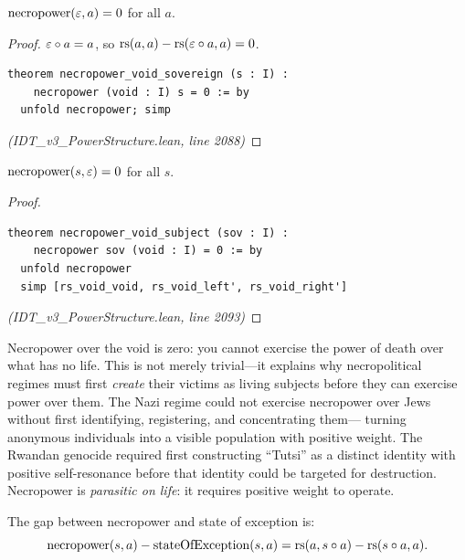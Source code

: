 \begin{theorem}
\label{thm:necro-void}
$\mathrm{necropower}(\varepsilon, a) = 0$ for all $a$.
\end{theorem}

\begin{proof}
$\varepsilon \circ a = a$, so $\mathrm{rs}(a,a) - \mathrm{rs}(\varepsilon \circ a, a) = 0$.
\begin{lstlisting}
theorem necropower_void_sovereign (s : I) :
    necropower (void : I) s = 0 := by
  unfold necropower; simp
\end{lstlisting}
\textit{(IDT\_v3\_PowerStructure.lean, line 2088)}
\end{proof}

\begin{theorem}
\label{thm:necro-void-subject}
$\mathrm{necropower}(s, \varepsilon) = 0$ for all $s$.
\end{theorem}

\begin{proof}
\begin{lstlisting}
theorem necropower_void_subject (sov : I) :
    necropower sov (void : I) = 0 := by
  unfold necropower
  simp [rs_void_void, rs_void_left', rs_void_right']
\end{lstlisting}
\textit{(IDT\_v3\_PowerStructure.lean, line 2093)}
\end{proof}

\begin{interpretation}
Necropower over the void is zero: you cannot exercise the power of death over
what has no life. This is not merely trivial---it explains why necropolitical
regimes must first \emph{create} their victims as living subjects before they
can exercise power over them. The Nazi regime could not exercise necropower
over Jews without first identifying, registering, and concentrating them---
turning anonymous individuals into a visible population with positive weight.
The Rwandan genocide required first constructing ``Tutsi'' as a distinct
identity with positive self-resonance before that identity could be targeted
for destruction. Necropower is \emph{parasitic on life}: it requires positive
weight to operate.
\end{interpretation}

\begin{theorem}
\label{thm:necro-exception}
The gap between necropower and state of exception is:
\[
  \mathrm{necropower}(s, a) - \mathrm{stateOfException}(s, a) = \mathrm{rs}(a, s \circ a) - \mathrm{rs}(s \circ a, a).
\]
\end{theorem}

